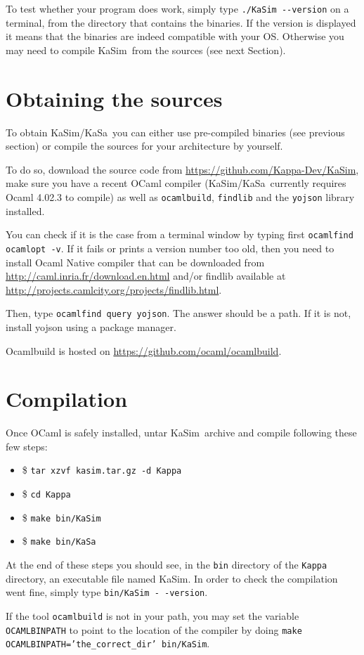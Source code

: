 \documentclass[11pt]{book}
\def\KaSim{\textsf{KaSim}}
\def\KaSa{\textsf{KaSa}}
\def\ttt#1{\texttt{#1}}
\def\ITE#1{\begin{itemize}#1\end{itemize}}
\def\dd{-\hspace{0.001cm}-}
\begin{document}
To test whether your program does work, simply type \ttt{./KaSim \dd version} on a terminal, from the directory that contains the binaries. If the version is displayed it means that the binaries are indeed compatible with your OS. Otherwise you may need to compile \KaSim~from the sources (see next Section).

\section{Obtaining the sources}\label{sec:sources}
To obtain \KaSim/\KaSa~you can either use pre-compiled binaries (see
previous section) or compile the sources for your
architecture by yourself.

To do so, download the source code from
\url{https://github.com/Kappa-Dev/KaSim}, make sure you have a recent
OCaml compiler (\KaSim/\KaSa~currently requires Ocaml 4.02.3 to
compile) as well as \ttt{ocamlbuild}, \ttt{findlib} and the
\ttt{yojson} library installed.

You can check if it is the case from a terminal window by typing
first \ttt{ocamlfind ocamlopt -v}. If it fails or prints a version number
too old, then you need to install Ocaml Native compiler that can be
downloaded from \url{http://caml.inria.fr/download.en.html} and/or
findlib available at
\url{http://projects.camlcity.org/projects/findlib.html}.

Then, type \ttt{ocamlfind query yojson}. The answer should be a
path. If it is not, install yojson using a package manager.

Ocamlbuild is hosted on \url{https://github.com/ocaml/ocamlbuild}.

\section{Compilation}
Once OCaml is safely installed, untar \KaSim~archive and compile following these
few steps: \ITE{
\item[\$]\ttt{tar xzvf kasim.tar.gz -d Kappa}
\item[\$]\ttt{cd Kappa}
\item[\$]\ttt{make bin/KaSim}
\item[\$]\ttt{make bin/KaSa}}

At the end of these steps you should see, in the
\ttt{bin} directory of the \ttt{Kappa} directory, an executable file named
KaSim.  In order to check the compilation went fine, simply type
\ttt{bin/KaSim -\,-version}.

If the tool \ttt{ocamlbuild} is not in your path, you may
set the variable \ttt{OCAMLBINPATH} to point to the location of the
compiler by doing \ttt{make OCAMLBINPATH='the\_correct\_dir' bin/KaSim}.
\end{document}

